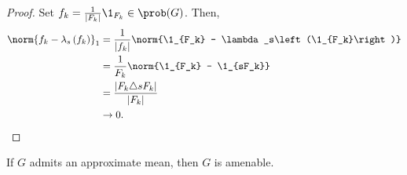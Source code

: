 \begin{proof}
  Set $f_k = \frac{1}{\left\vert F_k \right\vert}\1_{F_k}\in \prob(G)$. Then,
  \begin{align*}
    \norm{f_k - \lambda_s\left(f_k\right)}_{1} &= \frac{1}{\left\vert f_k \right\vert} \norm{\1_{F_k} - \lambda_s\left(\1_{F_k}\right)}\\
                                               &= \frac{1}{F_k}\norm{\1_{F_k} - \1_{sF_k}}\\
                                               &= \frac{\left\vert F_k\triangle sF_k \right\vert}{\left\vert F_k \right\vert}\\
                                               &\rightarrow 0.
  \end{align*}
\end{proof}
\begin{proposition}
  If $G$ admits an approximate mean, then $G$ is amenable.
\end{proposition}
